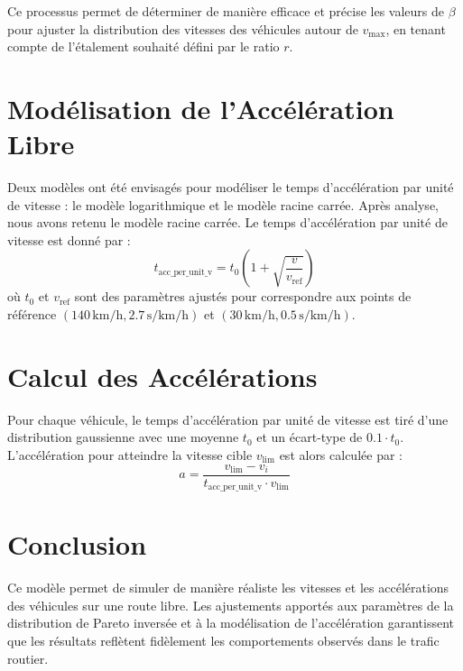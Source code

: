 \documentclass{article}
\begin{document}
Ce processus permet de déterminer de manière efficace et précise les valeurs de \(\beta\) pour ajuster la distribution des vitesses des véhicules autour de \(v_{\text{max}}\), en tenant compte de l'étalement souhaité défini par le ratio \(r\).



\section{Modélisation de l'Accélération Libre}
Deux modèles ont été envisagés pour modéliser le temps d'accélération par unité de vitesse : le modèle logarithmique et le modèle racine carrée. Après analyse, nous avons retenu le modèle racine carrée. Le temps d'accélération par unité de vitesse est donné par :
\[
t_{\text{acc\_per\_unit\_v}} = t_0 \left( 1 + \sqrt{\frac{v}{v_{\text{ref}}}} \right)
\]
où \(t_0\) et \(v_{\text{ref}}\) sont des paramètres ajustés pour correspondre aux points de référence \( (140 \, \text{km/h}, 2.7 \, \text{s/km/h}) \) et \( (30 \, \text{km/h}, 0.5 \, \text{s/km/h}) \).

\section{Calcul des Accélérations}
Pour chaque véhicule, le temps d'accélération par unité de vitesse est tiré d'une distribution gaussienne avec une moyenne \(t_0\) et un écart-type de \(0.1 \cdot t_0\). L'accélération pour atteindre la vitesse cible \(v_{\text{lim}}\) est alors calculée par :
\[
a = \frac{v_{\text{lim}} - v_i}{t_{\text{acc\_per\_unit\_v}} \cdot v_{\text{lim}}}
\]

\section{Conclusion}
Ce modèle permet de simuler de manière réaliste les vitesses et les accélérations des véhicules sur une route libre. Les ajustements apportés aux paramètres de la distribution de Pareto inversée et à la modélisation de l'accélération garantissent que les résultats reflètent fidèlement les comportements observés dans le trafic routier.
\end{document}
